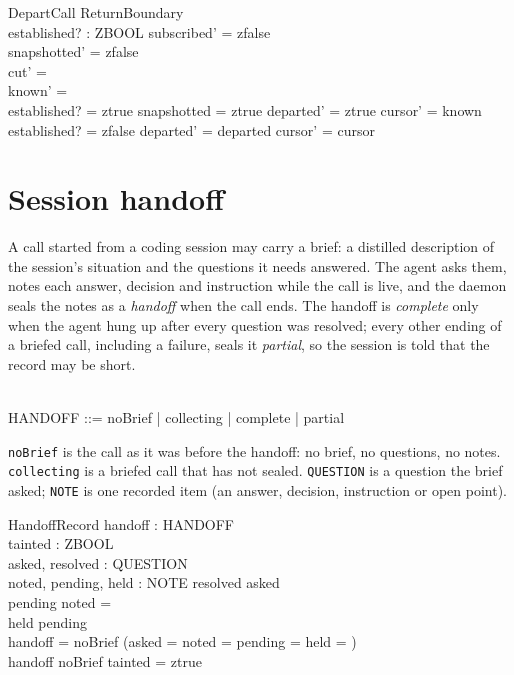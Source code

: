 \documentclass[a4paper,10pt,fleqn]{article}
\begin{document}
\begin{schema}{DepartCall}
  \Delta ReturnBoundary \\
  established? : ZBOOL
\where
  subscribed' = zfalse \\
  snapshotted' = zfalse \\
  cut' = \emptyset \\
  known' = \emptyset \\
  established? = ztrue \implies
    snapshotted = ztrue \land departed' = ztrue \land cursor' = known \\
  established? = zfalse \implies departed' = departed \land cursor' = cursor
\end{schema}

\section{Session handoff}

A call started from a coding session may carry a brief: a distilled
description of the session's situation and the questions it needs
answered. The agent asks them, notes each answer, decision and
instruction while the call is live, and the daemon seals the notes as a
\emph{handoff} when the call ends. The handoff is \emph{complete} only when
the agent hung up after every question was resolved; every other ending of
a briefed call, including a failure, seals it \emph{partial}, so the
session is told that the record may be short.

\begin{zed}
   \\
  HANDOFF ::= noBrief | collecting | complete | partial
\end{zed}

\texttt{noBrief} is the call as it was before the handoff: no brief, no
questions, no notes. \texttt{collecting} is a briefed call that has not
sealed. \texttt{QUESTION} is a question the brief asked; \texttt{NOTE} is
one recorded item (an answer, decision, instruction or open point).

\begin{schema}{HandoffRecord}
  handoff : HANDOFF \\
  tainted : ZBOOL \\
  asked, resolved : \power QUESTION \\
  noted, pending, held : \power NOTE
\where
  resolved \subseteq asked \\
  pending \cap noted = \emptyset \\
  held \subseteq pending \\
  handoff = noBrief \implies
    (asked = \emptyset \land noted = \emptyset \land pending = \emptyset
      \land held = \emptyset) \\
  handoff \neq noBrief \implies tainted = ztrue
\end{schema}
\end{document}
